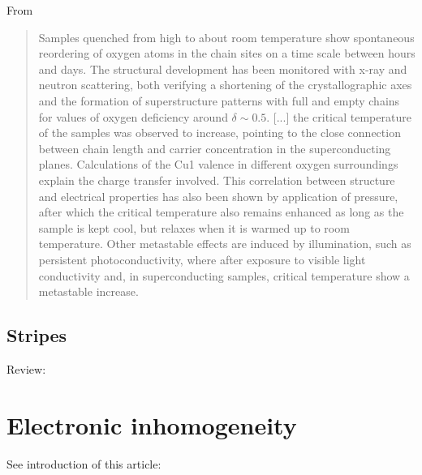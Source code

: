 From \cite{Bahrs2004}

\begin{quote}
Samples quenched from high to about room temperature show spontaneous reordering of oxygen atoms in the chain sites on a time scale between hours and days. 
The structural development has been monitored with x-ray and neutron scattering, both verifying a shortening of the crystallographic axes and the formation of superstructure patterns with full and empty chains for values of oxygen deficiency around $\delta \sim  0.5$. 
[...] the critical temperature of the samples was observed to increase, pointing to the close connection between chain length and carrier concentration in the superconducting planes. 
Calculations of the Cu1 valence in different oxygen surroundings explain the charge transfer involved. 
This correlation between structure and electrical properties has also been shown by application of pressure, after which the critical temperature also remains enhanced as long as the sample is kept cool, but relaxes when it is warmed up to room temperature. 
Other metastable effects are induced by illumination, such as persistent photoconductivity, where after exposure to visible light conductivity and, in superconducting samples, critical temperature show a metastable increase.
\end{quote}

\subsection{Stripes}

Review: \cite{Kivelson2003}

\section{Electronic inhomogeneity}
\label{sec:electronic_inhomogeneity}

See introduction of this article: \cite{Ivanov1995}

